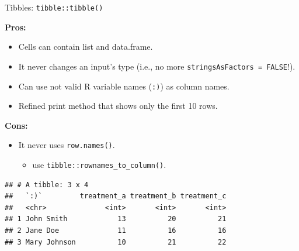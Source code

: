 \documentclass[14pt,ignorenonframetext,]{bredelebeamer}
\newenvironment{Shaded}{\begin{snugshade}}{\end{snugshade}}
\newcommand{\KeywordTok}[1]{\textcolor[rgb]{0.94,0.87,0.69}{#1}}
\newcommand{\DataTypeTok}[1]{\textcolor[rgb]{0.87,0.87,0.75}{#1}}
\newcommand{\StringTok}[1]{\textcolor[rgb]{0.80,0.58,0.58}{#1}}
\newcommand{\OperatorTok}[1]{\textcolor[rgb]{0.94,0.94,0.82}{#1}}
\newcommand{\NormalTok}[1]{\textcolor[rgb]{0.80,0.80,0.80}{#1}}
\providecommand{\tightlist}{%
  \setlength{\itemsep}{0pt}\setlength{\parskip}{0pt}}
\begin{document}
\begin{frame}[fragile]{Tibbles: \texttt{tibble::tibble()}}

\textbf{Pros: }

\begin{itemize}
\tightlist
\item
  Cells can contain list and data.frame.
\item
  It never changes an input's type (i.e., no more
  \texttt{stringsAsFactors\ =\ FALSE}!).
\item
  Can use not valid R variable names (\texttt{:)}) as column names.
\item
  Refined print method that shows only the first 10 rows.
\end{itemize}

\textbf{Cons: }

\begin{itemize}
\tightlist
\item
  It never uses \texttt{row.names()}.

  \begin{itemize}
  \tightlist
  \item
    use \texttt{tibble::rownames\_to\_column()}.
  \end{itemize}
\end{itemize}

\begin{Shaded}
\end{Shaded}

\begin{verbatim}
## # A tibble: 3 x 4
##   `:)`         treatment_a treatment_b treatment_c
##   <chr>              <int>       <int>       <int>
## 1 John Smith            13          20          21
## 2 Jane Doe              11          16          16
## 3 Mary Johnson          10          21          22
\end{verbatim}

\end{frame}
\end{document}
